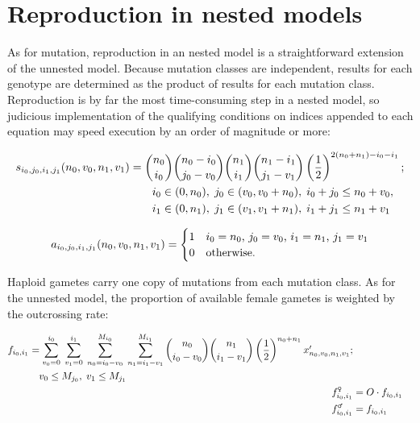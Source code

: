 \documentclass[12pt,twoside,letterpaper,fleqn]{report}
\numberwithin{equation}{section}  %
\newcommand{\Mjzero}{\mbox{$M_{j_0}$\/}}
\newcommand{\Mjone}{\mbox{$M_{j_1}$\/}}
\newcommand{\gamii}{\mbox{$f_{i_0,i_1}$}}
\newcommand{\gammaleii}{\mbox{$f_{i_0,i_1}^{\text{\Male}}$}}
\newcommand{\gamfemaleii}{\mbox{$f_{i_0,i_1}^{\text{\Female}}$}}
\newcommand{\xpnvnv}{\mbox{$x'_{n_0\/,v_0\/,n_1\/,v_1\/}$}}
\newcommand{\funcselfnested}{\mbox{$s_{i_0\/,j_0\/,i_1\/,j_1\/}(n_0\/,v_0\/,n_1\/,v_1\/)$}}
\newcommand{\funcapomixisnested}{\mbox{$a_{i_0\/,j_0\/,i_1\/,j_1\/}(n_0\/,v_0\/,n_1\/,v_1\/)$}}
\begin{document}
{\section{Reproduction in nested models}

As for mutation, reproduction in an nested model is a straightforward extension
of the unnested model.  Because mutation classes are independent, results for
each genotype are determined as the product of results for each mutation class.
Reproduction is by far the most time-consuming step in a nested model, so
judicious implementation of the qualifying conditions on indices appended to
each equation may speed execution by an order of magnitude or more:

\begin{equation}
\label{eq:nested:s}
\begin{split}
  \funcselfnested &= \binom{n_0}{i_0}\binom{n_0-i_0}{j_0-v_0}\binom{n_1}{i_1}\binom{n_1-i_1}{j_1-v_1}\left({\frac{1}{2}}\right)^{2(n_0+n_1)-i_0-i_1} ; \\
  & \qquad i_0\in(0,n_0),\;j_0\in(v_0,v_0 + n_0),\;i_0+j_0 \leq n_0+v_0,\\
  & \qquad i_1\in(0,n_1),\;j_1\in(v_1,v_1 + n_1),\;i_1+j_1 \leq n_1+v_1 
\end{split}
\end{equation}

\begin{equation}
\label{eq:nested:a}
\funcapomixisnested = 
  \begin{cases}
    1 & \text{$i_0=n_0$, $j_0=v_0$, $i_1=n_1$, $j_1=v_1$} \\
    0 & \text{otherwise.}  
  \end{cases}
\end{equation}

Haploid gametes carry one copy of mutations from each mutation class.  As for
the unnested model, the proportion of available female gametes is weighted by
the outcrossing rate:

\begin{align}
\begin{split}
\gamii   &= \sum_{v_0=0}^{i_0}{
	  						\; \sum_{v_1=0}^{i_1}{
                	\; \sum_{n_0=i_0-v_0}^{M_{i_0}}{
                		\; \sum_{n_1=i_1-v_1}^{M_{i_1}}{
                      \binom{n_0}{i_0-v_0} \binom{n_1}{i_1-v_1}
                      \left(\frac{1}{2}\right)^{n_0+n_1} \xpnvnv 
              }}}} ; \\ 
              & \quad v_0 \le \Mjzero, \; v_1 \le \Mjone
\end{split} \\
\gamfemaleii &= O \cdot \gamii \\
\gammaleii &= \gamii
\end{align}

}
\end{document}
